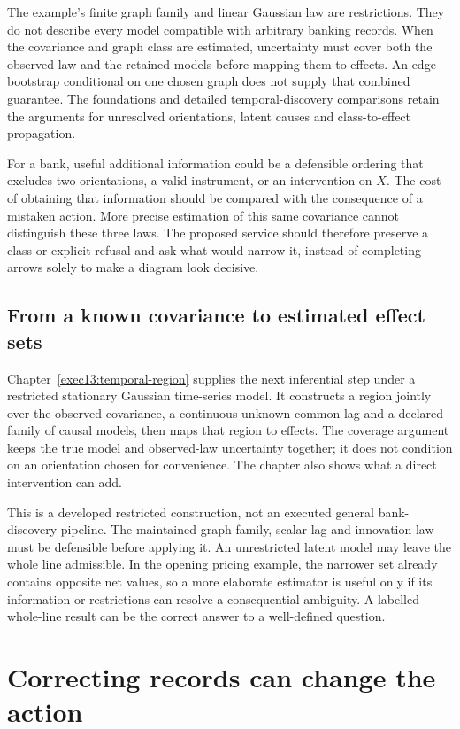 The example's finite graph family and linear Gaussian law are restrictions.
They do not describe every model compatible with arbitrary banking records.
When the covariance and graph class are estimated, uncertainty must cover
both the observed law and the retained models before mapping them to effects.
An edge bootstrap conditional on one chosen graph does not supply that
combined guarantee. The foundations and detailed temporal-discovery
comparisons retain the arguments for unresolved orientations, latent causes
and class-to-effect propagation.

For a bank, useful additional information could be a defensible ordering
that excludes two orientations, a valid instrument, or an intervention on
$X$. The cost of obtaining that information should be compared with the
consequence of a mistaken action. More precise estimation of this same
covariance cannot distinguish these three laws. The proposed service should
therefore preserve a class or explicit refusal and ask what would narrow it,
instead of completing arrows solely to make a diagram look decisive.

\section{From a known covariance to estimated effect sets}
Chapter~\ref{exec13:temporal-region} supplies the next inferential step under
a restricted stationary Gaussian time-series model. It constructs a region
jointly over the observed covariance, a continuous unknown common lag and a
declared family of causal models, then maps that region to effects. The
coverage argument keeps the true model and observed-law uncertainty together;
it does not condition on an orientation chosen for convenience. The chapter
also shows what a direct intervention can add.

This is a developed restricted construction, not an executed general
bank-discovery pipeline. The maintained graph family, scalar lag and
innovation law must be defensible before applying it. An unrestricted latent
model may leave the whole line admissible. In the opening pricing example,
the narrower set already contains opposite net values, so a more elaborate
estimator is useful only if its information or restrictions can resolve a
consequential ambiguity. A labelled whole-line result can be the correct
answer to a well-defined question.

\chapter{Correcting records can change the action}
\label{rewrite:observation}

